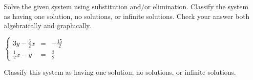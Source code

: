 \documentclass{ximera}
\author{Elizabeth Miller}
\begin{document}
Solve the given system using substitution and/or elimination. Classify the system as having one solution, no solutions, or infinite solutions. Check your answer both algebraically and graphically.

$\left\{ \begin{array}{rcr} 3y-\frac{3}{2}x & = & -\frac{15}{2}  \\ [5pt] \frac{1}{2}x-y & = & \frac{3}{2} \end{array} \right.$  

\begin{exercise}
Classify this system as having one solution, no solutions, or infinite solutions.
\begin{multipleChoice}  
\end{multipleChoice}  
\end{exercise}
\end{document}
